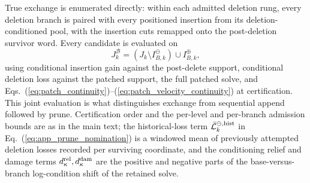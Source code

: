 \documentclass[
  reprint,
  amsmath,
  amssymb,
  aps,
  pra,
  nofootinbib,
  superscriptaddress,
  floatfix
]{revtex4-2}
\begin{document}
True exchange is enumerated directly: within each admitted deletion rung, every deletion branch is paired with every positioned insertion from its deletion-conditioned pool, with the insertion cuts remapped onto the post-deletion survivor word.  Every candidate is evaluated on
\[
J_k^{\mathcal B}
=(J_k\setminus I_{B,k}^{\ominus})\cup I_{B,k}^{\oplus},
\]
using conditional insertion gain against the post-delete support, conditional deletion loss against the patched support, the full patched solve, and Eqs.~(\ref{eq:patch_continuity})--(\ref{eq:patch_velocity_continuity}) at certification.  This joint evaluation is what distinguishes exchange from sequential append followed by prune.  Certification order and the per-level and per-branch admission bounds are as in the main text; the historical-loss term \(\bar{\mathcal L}_k^{\ominus,\rm hist}\) in Eq.~(\ref{eq:app_prune_nomination}) is a windowed mean of previously attempted deletion losses recorded per surviving coordinate, and the conditioning relief and damage terms \(d_{\kappa}^{\rm rel},d_{\kappa}^{\rm dam}\) are the positive and negative parts of the base-versus-branch log-condition shift of the retained solve.
\end{document}
